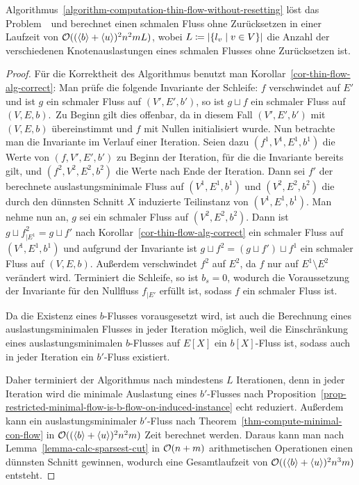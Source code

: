 \begin{theorem}
		Algorithmus~\ref{algorithm-computation-thin-flow-without-resetting} löst das Problem~\probTFwoR\ und berechnet einen schmalen Fluss ohne Zurücksetzen in einer Laufzeit von $\mathcal{O}((\langle b\rangle + \langle u\rangle)^2 n^2 m L)$, wobei $L\coloneq \lvert\{ l_v \mid v\in V \}\rvert$ die Anzahl der verschiedenen Knotenauslastungen eines schmalen Flusses ohne Zurücksetzen ist.
\end{theorem}
\begin{proof}
	Für die Korrektheit des Algorithmus benutzt man Korollar~\ref{cor-thin-flow-alg-correct}:
	Man prüfe die folgende Invariante der Schleife:
	\glqq $f$ verschwindet auf $E'$ und ist $g$ ein schmaler Fluss auf $(V',E',b')$, so ist $g \sqcup f$ ein schmaler Fluss auf $(V, E, b)$.\grqq\ 
	Zu Beginn gilt dies offenbar, da in diesem Fall $(V', E', b')$ mit $(V, E, b)$ übereinstimmt und $f$ mit Nullen initialisiert wurde.
	Nun betrachte man die Invariante im Verlauf einer Iteration.
	Seien dazu $(f^1, V^1, E^1, b^1)$ die Werte von $(f, V', E', b')$ zu Beginn der Iteration, für die die Invariante bereits gilt, und $(f^2, V^2, E^2, b^2)$ die Werte nach Ende der Iteration.
	Dann sei $f'$ der berechnete auslastungsminimale Fluss auf $(V^1, E^1, b^1)$ und $(V^2, E^2, b^2)$ die durch den dünnsten Schnitt $X$ induzierte Teilinstanz von $(V^1, E^1, b^1)$.
	Man nehme nun an, $g$ sei ein schmaler Fluss auf $(V^2, E^2, b^2)$.
	Dann ist $g\sqcup f^2_{\mid E^1} = g \sqcup f'$ nach Korollar~\ref{cor-thin-flow-alg-correct} ein schmaler Fluss auf $(V^1, E^1, b^1)$ und aufgrund der Invariante ist $g \sqcup f^2 = (g \sqcup f') \sqcup f^1$ ein schmaler Fluss auf $(V, E, b)$.
	Außerdem verschwindet $f^2$ auf $E^2$, da $f$ nur auf $E^1\setminus E^2$ verändert wird.
	Terminiert die Schleife, so ist $b_s=0$, wodurch die Voraussetzung der Invariante
	für den Nullfluss $f_{\mid E'}$ erfüllt ist, sodass $f$ ein schmaler Fluss ist.
	
	Da die Existenz eines $b$-Flusses vorausgesetzt wird, ist auch die Berechnung eines auslastungsminimalen Flusses in jeder Iteration möglich, weil die Einschränkung eines auslastungsminimalen $b$-Flusses auf $E[X]$ ein $b[X]$-Fluss ist, sodass auch in jeder Iteration ein $b'$-Fluss existiert.
	
	Daher terminiert der Algorithmus nach mindestens $L$ Iterationen, denn in jeder Iteration wird die minimale Auslastung eines $b'$-Flusses nach Proposition~\ref{prop-restricted-minimal-flow-is-b-flow-on-induced-instance} echt reduziert.
	Außerdem kann ein auslastungsminimaler $b'$-Fluss nach Theorem~\ref{thm-compute-minimal-con-flow} in $\mathcal{O}((\langle b\rangle+\langle u\rangle)^2 n^2 m)$ Zeit berechnet werden.
	Daraus kann man nach Lemma~\ref{lemma-calc-sparsest-cut} in $\mathcal{O}(n+m)$ arithmetischen Operationen einen dünnsten Schnitt gewinnen, wodurch eine Gesamtlaufzeit von $\mathcal{O}((\langle b\rangle + \langle u\rangle)^2 n^3 m)$ entsteht.
\end{proof}

